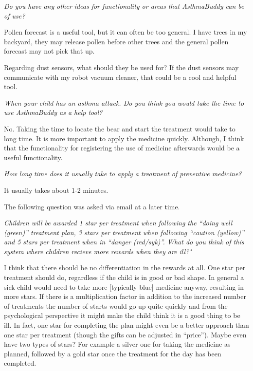 \emph{Do you have any other ideas for functionality or areas that AsthmaBuddy can be of use?}

Pollen forecast is a useful tool, but it can often be too general. I have trees in my backyard, they may release pollen before other trees and the general pollen forecast may not pick that up. 

Regarding dust sensors, what should they be used for? If the dust sensors may communicate with my robot vacuum cleaner, that could be a cool and helpful tool. 


\emph{When your child has an asthma attack. Do you think you would take the time to use AsthmaBuddy as a help tool?}

No. Taking the time to locate the bear and start the treatment would take to long time. It is more important to apply the medicine quickly. Although, I think that the functionality for registering the use of medicine afterwards would be a useful functionality.

\emph{How long time does it usually take to apply a treatment of preventive medicine?}

It usually takes about 1-2 minutes. 


The following question was asked via email at a later time.

\emph{Children will be awarded 1 star per treatment when following the ``doing well (green)'' treatment plan, 3 stars per treatment when following ``caution (yellow)'' and 5 stars per treatment when in ``danger (red/syk)''. What do you think of this system where children recieve more rewards when they are ill?"}

I think that there should be no differentiation in the rewards at all. One star per treatment should do, regardless if the child is in good or bad shape. In general a sick child would need to take more [typically blue] medicine anyway, resulting in more stars.  
If there is a multiplication factor in addition to the increased number of treatments the number of starts would go up quite quickly and from the psychological perspective it might make the child think it is a good thing to be ill. In fact, one star for completing the plan might even be a better approach than one star per treatment (though the gifts can be adjusted in ``price''). Maybe even have two types of stars? For example a silver one for taking the medicine as planned, followed by a gold star once the treatment for the day has been completed.
